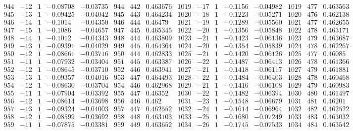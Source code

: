 \documentclass[11pt,reqno,a4letter]{article}
\numberwithin{figure}{section}
\numberwithin{table}{section}
\theoremstyle{plain}
\numberwithin{theorem}{section}
\theoremstyle{definition}
\begin{document}
\begin{table}[ht]
\begin{equation*}
{\begin{array}{ccccc|ccc|ccccc|ccc}
 944 & -12 & 1 & -0.08708 & -0.03735 & 944 & 442 & 0.463676 & 1019 & -17 & 1 & -0.1156 & -0.04982 & 1019 & 477 & 0.463563 \\
 945 & -13 & 1 & -0.09425 & -0.04042 & 945 & 443 & 0.464234 & 1020 & -18 & 1 & -0.1223 & -0.05271 & 1020 & 476 & 0.462138 \\
 946 & -14 & 1 & -0.1014 & -0.04350 & 946 & 444 & 0.46479 & 1021 & -19 & 1 & -0.1289 & -0.05560 & 1021 & 477 & 0.462655 \\
 947 & -15 & 1 & -0.1086 & -0.04657 & 947 & 445 & 0.465345 & 1022 & -20 & 1 & -0.1356 & -0.05848 & 1022 & 478 & 0.463171 \\
 948 & -14 & 1 & -0.1012 & -0.04343 & 948 & 444 & 0.463809 & 1023 & -21 & 1 & -0.1423 & -0.06136 & 1023 & 479 & 0.463687 \\
 949 & -13 & 1 & -0.09391 & -0.04029 & 949 & 445 & 0.464364 & 1024 & -20 & 1 & -0.1354 & -0.05839 & 1024 & 478 & 0.462267 \\
 950 & -12 & 1 & -0.08661 & -0.03716 & 950 & 444 & 0.462833 & 1025 & -21 & 1 & -0.1420 & -0.06126 & 1025 & 477 & 0.46085 \\
 951 & -11 & 1 & -0.07932 & -0.03404 & 951 & 445 & 0.463387 & 1026 & -22 & 1 & -0.1487 & -0.06413 & 1026 & 478 & 0.461366 \\
 952 & -12 & 1 & -0.08645 & -0.03710 & 952 & 446 & 0.463941 & 1027 & -21 & 1 & -0.1418 & -0.06117 & 1027 & 479 & 0.461881 \\
 953 & -13 & 1 & -0.09357 & -0.04016 & 953 & 447 & 0.464493 & 1028 & -22 & 1 & -0.1484 & -0.06403 & 1028 & 478 & 0.460468 \\
 954 & -12 & 1 & -0.08630 & -0.03704 & 954 & 446 & 0.462968 & 1029 & -21 & 1 & -0.1416 & -0.06108 & 1029 & 479 & 0.460983 \\
 955 & -11 & 1 & -0.07904 & -0.03392 & 955 & 447 & 0.46352 & 1030 & -22 & 1 & -0.1482 & -0.06394 & 1030 & 480 & 0.461497 \\
 956 & -12 & 1 & -0.08614 & -0.03698 & 956 & 446 & 0.462 & 1031 & -23 & 1 & -0.1548 & -0.06679 & 1031 & 481 & 0.46201 \\
 957 & -13 & 1 & -0.09324 & -0.04003 & 957 & 447 & 0.462552 & 1032 & -24 & 1 & -0.1614 & -0.06964 & 1032 & 482 & 0.462522 \\
 958 & -12 & 1 & -0.08599 & -0.03692 & 958 & 448 & 0.463103 & 1033 & -25 & 1 & -0.1680 & -0.07249 & 1033 & 483 & 0.463032 \\
 959 & -11 & 1 & -0.07875 & -0.03381 & 959 & 449 & 0.463652 & 1034 & -26 & 1 & -0.1745 & -0.07533 & 1034 & 484 & 0.463542 \\

\end{array}}
\end{equation*}
\end{table}
\end{document}
